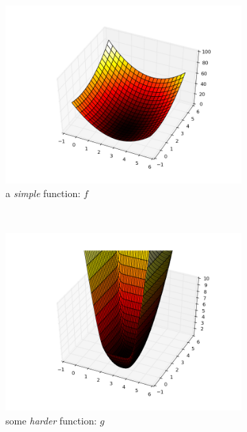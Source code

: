\documentclass[a4paper,twoside,10pt]{amsart}
\numberwithin{equation}{section} %
\numberwithin{figure}{section} %
\numberwithin{table}{section} %
\theoremstyle{definition}
\begin{document}
\begin{figure}[h!]
    \centering
    \begin{subfigure}[b]{0.48\textwidth}
        \centering
        \includegraphics[width=1.0\textwidth]{simple.png}
        \caption{a \emph{simple} function: $f$}
    \end{subfigure}
    ~ 
    \begin{subfigure}[b]{0.48\textwidth}
        \centering
        \includegraphics[width=1.0\textwidth]{harder.png}
        \caption{some \emph{harder} function: $g$}
    \end{subfigure} \\
    \centering
    \begin{subfigure}[b]{0.48\textwidth}

\end{subfigure}
\end{figure}
\end{document}
